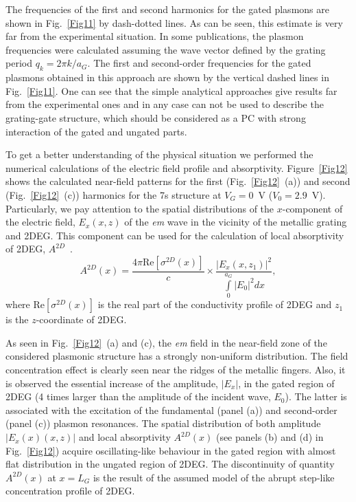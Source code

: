\documentclass[%
 reprint,
 amsmath,amssymb,
 aps,
]{revtex4-2}
\begin{document}
The frequencies of the first and second harmonics for the gated plasmons are shown in Fig.~\ref{Fig11} by dash-dotted lines. 
As can be seen, this estimate is very far from the experimental situation.  
In some publications, the plasmon frequencies were calculated assuming the wave vector defined by the grating period $q_{k}=2\pi k/a_{G}$. 
The first and second-order frequencies for the gated plasmons obtained in this approach are shown by the vertical dashed lines in Fig.~\ref{Fig11}. 
One can see that the simple analytical approaches give results far from the experimental ones and in any case can not be used to describe the grating-gate structure, which should be considered as a PC with strong interaction of the gated and ungated parts.

To get a better understanding of the physical situation we performed the numerical calculations of the electric field profile and absorptivity.
Figure~\ref{Fig12} shows the calculated near-field patterns for the first (Fig.~\ref{Fig12}~(a)) and second (Fig.~\ref{Fig12}~(c)) harmonics for the 7s structure at $V_G = 0$~V ($V_0 = 2.9$~V).
 Particularly, we pay attention to the spatial distributions of the $x$-component of the electric field, $E_x(x,z)$ of the \textit{em} wave in the vicinity of the metallic grating and 2DEG. This component can be used for the calculation of local absorptivity of 2DEG, $A^{2D}$~\cite{KorRCWA2021}.
\begin{equation}
\label{localab}
A^{2D}(x)=\frac{4\pi\text{Re}[\sigma^{2D}(x)]}{c}\times\frac{|E_{x}(x,z_{1})|^2}{\int\limits_{0}^{a_{G}}|E_{0}|^2dx},
\end{equation}
where  $\text{Re}[\sigma^{2D}(x)]$ is the real part of the conductivity profile of 2DEG and $z_{1}$ is the $z$-coordinate of 2DEG.

As seen in Fig.~\ref{Fig12}~(a) and (c), the \textit{em} field in the near-field zone of the considered plasmonic structure has a strongly non-uniform distribution. The field concentration effect is clearly seen near the ridges of the metallic fingers. Also, it is observed the essential increase of the amplitude, $|E_x|$, in the gated region of 2DEG (4 times larger than the amplitude of the incident wave, $E_0$). The latter is associated with the excitation of the fundamental (panel (a)) and second-order (panel (c)) plasmon resonances. The spatial distribution of both amplitude $|E_x(x)(x,z)|$ and local absorptivity $A^{2D}(x)$ (see panels (b) and (d) in Fig.~\ref{Fig12}) acquire oscillating-like behaviour in the gated region with almost flat distribution in the ungated region of 2DEG. 
The discontinuity of quantity $A^{2D} (x)$ at $x=L_G$ is the result of the assumed model of the abrupt step-like concentration profile of 2DEG.
\end{document}
